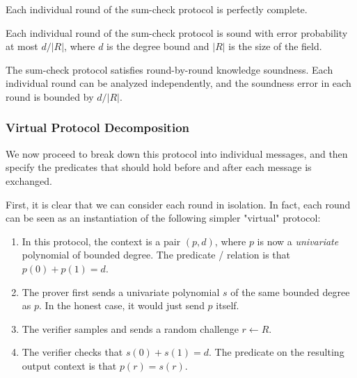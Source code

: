 \begin{theorem}
    \label{thm:sumcheck_single_round_completeness}
    Each individual round of the sum-check protocol is perfectly complete.
\end{theorem}

\begin{theorem}
    \label{thm:sumcheck_single_round_soundness}
    Each individual round of the sum-check protocol is sound with error probability at most $d / |R|$, where $d$ is the degree bound and $|R|$ is the size of the field.
\end{theorem}

\begin{theorem}
    \label{thm:sumcheck_rbr_knowledge_soundness}
    The sum-check protocol satisfies round-by-round knowledge soundness. Each individual round can be analyzed independently, and the soundness error in each round is bounded by $d / |R|$.
\end{theorem}

\subsubsection{Virtual Protocol Decomposition}

We now proceed to break down this protocol into individual messages, and then specify the predicates that should hold before and after each message is exchanged.

First, it is clear that we can consider each round in isolation. In fact, each round can be seen as an instantiation of the following simpler "virtual" protocol:

\begin{definition}
    \label{def:virtual_sumcheck_round_protocol}
    \begin{enumerate}
        \item In this protocol, the context is a pair $(p, d)$, where $p$ is now a \emph{univariate} polynomial of bounded degree. The predicate / relation is that $p(0) + p(1) = d$.
        \item The prover first sends a univariate polynomial $s$ of the same bounded degree as $p$. In
        the honest case, it would just send $p$ itself.
        \item The verifier samples and sends a random challenge $r \gets R$.
        \item The verifier checks that $s(0) + s(1) = d$. The predicate on the resulting output context
        is that $p(r) = s(r)$.
    \end{enumerate}
\end{definition}

